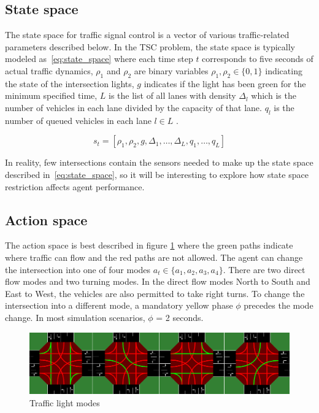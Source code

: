 \documentclass[letterpaper]{article} %
\begin{document}
\subsection{State space}
The state space for traffic signal control is a vector of various traffic-related parameters described below.
In the TSC problem, the state space is typically modeled as~\ref{eq:state_space} where each time step \(t\) corresponds to five seconds of actual traffic dynamics, \(\rho_1\) and \(\rho_2\) are binary variables \(\rho_1, \rho_2 \in \{0, 1\}\) indicating the state of the intersection lights, \(g\) indicates if the light has been green for the minimum specified time, \(L\) is the list of all lanes with density \(\Delta_l\) which is the number of vehicles in each lane divided by the capacity of that lane.
\(q_l\) is the number of queued vehicles in each lane \(l \in L\) \cite{Almeida2022MultiagentRL}.

\begin{equation}
s_t = [\rho_1, \rho_2, g, \Delta_1, \ldots, \Delta_L, q_1, \ldots, q_L]
\label{eq:state_space}
\end{equation}

In reality, few intersections contain the sensors needed to make up the state space described in~\ref{eq:state_space}, so it will be interesting to explore how state space restriction affects agent performance.

\subsection{Action space}
The action space is best described in figure \ref{fig:action_space} where the green paths indicate where traffic can flow and the red paths are not allowed.
The agent can change the intersection into one of four modes \(a_t \in \{a_1, a_2, a_3, a_4\}\).
There are two direct flow modes and two turning modes.
In the direct flow modes North to South and East to West, the vehicles are also permitted to take right turns.
To change the intersection into a different mode, a mandatory yellow phase $\phi$ precedes the mode change.
In most simulation scenarios, $\phi$ = 2 seconds.

\begin{figure}[htbp]
  \centering
  \includegraphics[width=0.8\linewidth]{actions.png}
  \caption{Traffic light modes}
  \label{fig:action_space}
\end{figure}
\end{document}
